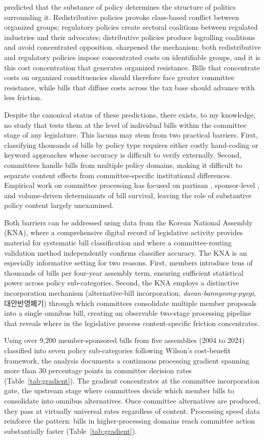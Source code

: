 \documentclass[11pt]{article}
\begin{document}
\citet{lowi1964} predicted that the substance of policy determines the structure of politics surrounding it. Redistributive policies provoke class-based conflict between organized groups; regulatory policies create sectoral coalitions between regulated industries and their advocates; distributive policies produce logrolling coalitions and avoid concentrated opposition. \citet{wilson1980} sharpened the mechanism: both redistributive and regulatory policies impose concentrated costs on identifiable groups, and it is this cost concentration that generates organized resistance. Bills that concentrate costs on organized constituencies should therefore face greater committee resistance, while bills that diffuse costs across the tax base should advance with less friction.

Despite the canonical status of these predictions, there exists, to my knowledge, no study that tests them at the level of individual bills within the committee stage of any legislature. This lacuna may stem from two practical barriers. First, classifying thousands of bills by policy type requires either costly hand-coding or keyword approaches whose accuracy is difficult to verify externally. Second, committees handle bills from multiple policy domains, making it difficult to separate content effects from committee-specific institutional differences. Empirical work on committee processing has focused on partisan \citep{cox2005}, sponsor-level \citep{volden2016,bucchianeri2024}, and volume-driven \citep{krutz2005} determinants of bill survival, leaving the role of substantive policy content largely unexamined.

Both barriers can be addressed using data from the Korean National Assembly (KNA), where a comprehensive digital record of legislative activity provides material for systematic bill classification and where a committee-routing validation method independently confirms classifier accuracy. The KNA is an especially informative setting for two reasons. First, members introduce tens of thousands of bills per four-year assembly term, ensuring sufficient statistical power across policy sub-categories. Second, the KNA employs a distinctive incorporation mechanism (alternative-bill incorporation, \textit{daean-bannyeong-pyegi}, 대안반영폐기) through which committees consolidate multiple member proposals into a single omnibus bill, creating an observable two-stage processing pipeline that reveals where in the legislative process content-specific friction concentrates.

Using over 9,200 member-sponsored bills from five assemblies (2004 to 2024) classified into seven policy sub-categories following Wilson's cost-benefit framework, the analysis documents a continuous processing gradient spanning more than 30 percentage points in committee decision rates (Table~\ref{tab:gradient}). The gradient concentrates at the committee incorporation gate, the upstream stage where committees decide which member bills to consolidate into omnibus alternatives. Once committee alternatives are produced, they pass at virtually universal rates regardless of content. Processing speed data reinforce the pattern: bills in higher-processing domains reach committee action substantially faster (Table~\ref{tab:gradient}).
\end{document}
